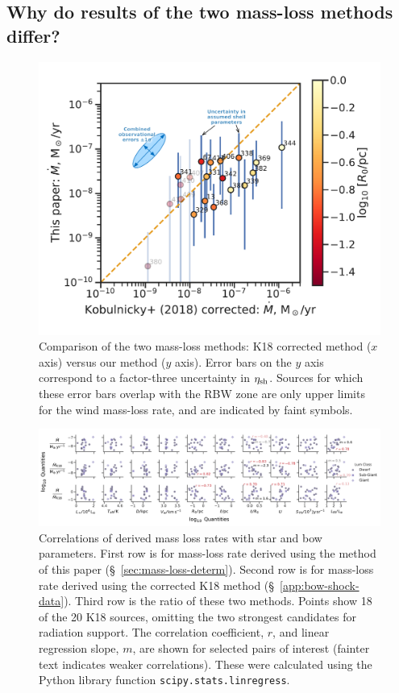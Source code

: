 \subsection{Why do results of the two mass-loss methods differ?}
\label{sec:underst-diff-betw}

\begin{figure}
  \centering
  \includegraphics[width=\linewidth]{figs/K18-mdot-corrected-comparison-R0-edited}
  \caption{Comparison of the two mass-loss methods: K18 corrected
    method (\(x\) axis) versus our method (\(y\) axis).  Error bars on
    the \(y\) axis correspond to a factor-three uncertainty in
    \(\eta_{\text{sh}}\).  Sources for which these error bars overlap with
    the RBW zone are only upper limits for the wind mass-loss rate,
    and are indicated by faint symbols.}
  \label{fig:mass-loss-comparison}
\end{figure}

\begin{figure}
  \centering
  \includegraphics[width=\linewidth]{figs/mdot_correlations_edited}
  \caption{Correlations of derived mass loss rates with star and bow
    parameters. First row is for mass-loss rate derived using the
    method of this paper (\S~\ref{sec:mass-loss-determ}).  Second row
    is for mass-loss rate derived using the corrected K18 method
    (\S~\ref{app:bow-shock-data}).  Third row is the ratio of these
    two methods.  Points show 18 of the 20 K18 sources, omitting the
    two strongest candidates for radiation support.  The correlation
    coefficient, \(r\), and linear regression slope, \(m\), are shown
    for selected pairs of interest (fainter text indicates weaker
    correlations).  These were calculated using the Python library
    function \texttt{scipy.stats.linregress}.}
  \label{fig:correlations}
\end{figure}

